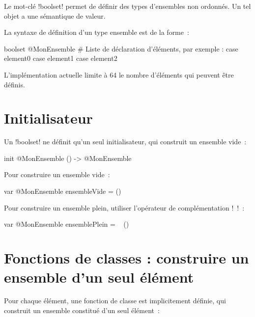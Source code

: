 




Le mot-clé \ggsq!boolset! permet de définir des types d'ensembles non ordonnés. Un tel objet a une sémantique de valeur.

La syntaxe de définition d'un type ensemble est de la forme~:

\begin{galgas34}
boolset @MonEnsemble {
  # Liste de déclaration d'éléments, par exemple :
  case element0
  case element1
  case element2
}
\end{galgas34}

L'implémentation actuelle limite à 64 le nombre d'éléments qui peuvent être définis.

\section{Initialisateur}

Un \ggsq!boolset! ne définit qu'un seul initialisateur, qui construit un ensemble vide~:
\begin{galgas34}
init @MonEnsemble () -> @MonEnsemble
\end{galgas34}
Pour construire un ensemble vide~:
\begin{galgas34}
var @MonEnsemble ensembleVide = ()
\end{galgas34}

Pour construire un ensemble plein, utiliser l'opérateur de complémentation \ggsq!~!~:
\begin{galgas34}
var @MonEnsemble ensemblePlein = ~ ()
\end{galgas34}










\section{Fonctions de classes : construire un ensemble d'un seul élément}

Pour chaque élément, une fonction de classe est implicitement définie, qui construit un ensemble constitué d'un seul élément~:

